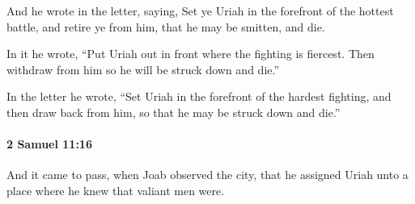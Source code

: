 			\begin{versebox}
					\item[BHS] 
					\item[ASV] And he wrote in the letter, saying, Set ye Uriah in the forefront of the hottest battle, and retire ye from him, that he may be smitten, and die.
					\item[NIV] In it he wrote, “Put Uriah out in front where the fighting is fiercest. Then withdraw from him so he will be struck down and die.”
					\item[NRSV] In the letter he wrote, “Set Uriah in the forefront of the hardest fighting, and then draw back from him, so that he may be struck down and die.”
			\end{versebox}

		\paragraph{2 Samuel 11:16} %
			\label{2SAMUEL-11-16}

			And it came to pass, when Joab observed the city, that he assigned Uriah unto a place where he knew that valiant men were.

